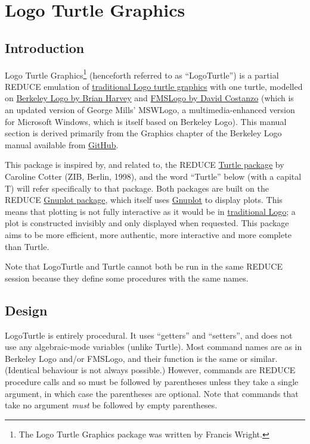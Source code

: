 \section{Logo Turtle Graphics}


\subsection{Introduction}

Logo Turtle Graphics\footnote{The Logo Turtle Graphics package was
written by Francis Wright.} (henceforth referred to as ``LogoTurtle'')
is a partial REDUCE emulation of
\href{https://en.wikipedia.org/wiki/Turtle_graphics}{traditional Logo
  turtle graphics} with one turtle, modelled on
\href{http://people.eecs.berkeley.edu/~bh/logo.html}{Berkeley Logo by
  Brian Harvey} and \href{https://fmslogo.sourceforge.io/}{FMSLogo by
  David Costanzo} (which is an updated version of George Mills'
MSWLogo, a multimedia-enhanced version for Microsoft Windows, which is
itself based on Berkeley Logo).  This manual section is derived
primarily from the Graphics chapter of the Berkeley Logo manual
available from
\href{https://github.com/jrincayc/ucblogo-code}{GitHub}.

This package is inspired by, and related to, the REDUCE
\hyperref[package:TURTLE]{Turtle package} by Caroline Cotter (ZIB,
Berlin, 1998), and the word ``Turtle'' below (with a capital T) will
refer specifically to that package.  Both packages are built on the
REDUCE \hyperref[package:GNUPLOT]{Gnuplot package}, which itself uses
\href{http://gnuplot.info/}{Gnuplot} to display plots.  This means
that plotting is not fully interactive as it would be in
\href{https://en.wikipedia.org/wiki/Logo_(programming_language)}{traditional
  Logo}; a plot is constructed invisibly and only displayed when
requested.  This package aims to be more efficient, more authentic,
more interactive and more complete than Turtle.

Note that LogoTurtle and Turtle cannot both be run in the same REDUCE
session because they define some procedures with the same names.


\subsection{Design}

LogoTurtle is entirely procedural.  It uses ``getters'' and
``setters'', and does not use any algebraic-mode variables (unlike
Turtle).  Most command names are as in Berkeley Logo and/or FMSLogo,
and their function is the same or similar.  (Identical behaviour is
not always possible.)  However, commands are REDUCE procedure calls
and so must be followed by parentheses unless they take a single
argument, in which case the parentheses are optional.  Note that
commands that take no argument \emph{must} be followed by empty
parentheses.

